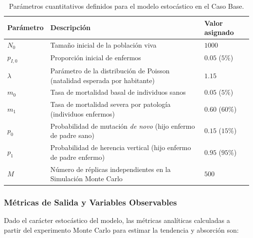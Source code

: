 \documentclass[graybox]{SNmult}
\begin{document}
	\begin{table}[htbp]
		\caption{Parámetros cuantitativos definidos para el modelo estocástico en el Caso Base.}
		\label{tab:parametros_caso_base}
		\centering
		\begin{tabular}{lll}
			\hline
			\textbf{Parámetro} & \textbf{Descripción} & \textbf{Valor asignado} \\
			\hline
			$N_0$ & Tamaño inicial de la población viva & $1000$ \\
			$p_{I,0}$ & Proporción inicial de enfermos & $0.05$ ($5\%$) \\
			$\lambda$ & Parámetro de la distribución de Poisson (natalidad esperada por habitante) & $1.15$ \\
			$m_0$ & Tasa de mortalidad basal de individuos sanos & $0.05$ ($5\%$) \\
			$m_1$ & Tasa de mortalidad severa por patología (individuos enfermos) & $0.60$ ($60\%$) \\
			$p_0$ & Probabilidad de mutación \textit{de novo} (hijo enfermo de padre sano) & $0.15$ ($15\%$) \\
			$p_1$ & Probabilidad de herencia vertical (hijo enfermo de padre enfermo) & $0.95$ ($95\%$) \\
			$M$ & Número de réplicas independientes en la Simulación Monte Carlo & $500$ \\
			\hline
		\end{tabular}
	\end{table}
	
	\subsubsection{Métricas de Salida y Variables Observables}
	Dado el carácter estocástico del modelo, las métricas analíticas calculadas a partir del experimento Monte Carlo para estimar la tendencia y absorción son:
	
\end{document}

